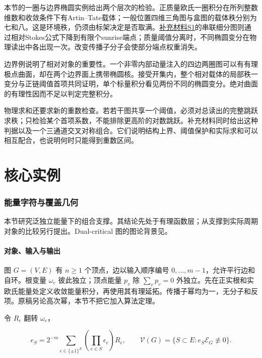 \documentclass[11pt,a4paper,oneside]{ctexart}
\theoremstyle{cnplain}
\theoremstyle{definition}
\theoremstyle{remark}
\numberwithin{equation}{section}
\newcommand{\otherref}[2]{\href{#1.pdf}{#2}}
\begin{document}
本节的一圈与边界椭圆实例给出两个层次的检验。正质量欧氏一圈积分在所列整数维数和收敛条件下有Artin--Tate载体；一般位置四维三角图与盒图的载体秩分别为七和八。这是环境秩，仍须由标架决定是否取满。\otherref{feynman_periods_supplement}{补充材料S1}的串联细分图则通过相对Stokes公式下降到有限个sunrise端点；质量阈值分离时，不同椭圆变分在物理读出中各出现一次。改变传播子分子会使部分端点权重消失。

边界例说明了相对对象的重要性。一个非零内部动量注入的四边两圈图可以有有理极点曲面，却在两个边界面上携带椭圆核。接受开集内，整个相对载体的局部秩一变分与正链阈值首项共同证明，单个标量积分看见两份不同的椭圆变分。绝对曲面的有理性因而不足以判定完整积分。

物理求和还要求新的重数检查。若若干图共享一个阈值，必须对总读出的完整跳跃求秩；只检验某个首项系数，不能排除更高阶的对数跳跃。补充材料同时给出这种判据以及一个三通道交叉对称组合。它们说明结构上界、阈值保护和实际求和可以相互配合，也说明何时只能得到重数区间。

\part{核心实例}

\section{能量字符与覆盖几何}\label{ch:graph}

\begingroup

本节研究泛独立能量下的组合支撑。其结论先处于有理函数层；从支撑到实际周期对象的比较另行提出。Dual-critical 图的图论背景见\cite{dualcritical}。

\subsection{对象、输入与输出}\label{sec:graph:1}

图 \(G=(V,E)\) 有 \(n\geq1\) 个顶点，边以输入顺序编号 \(0,\ldots,m-1\)，允许平行边和自环。根变量 \(\omega_e\) 彼此独立；顶点能量 \(p_v\) 除 \(\sum_vp_v=0\) 外独立。先在正实根和实欧氏能量处定义收敛能量积分，再使用其有理延拓。传播子幂均为一，无分子和反项。原稿另论高次幂，本节不把它加入算法定理。

令 \(R_e\) 翻转 \(\omega_e\)，

\begin{equation}
e_S=2^{-m}\sum_{\epsilon\in\{\pm1\}^{E}}
       \left(\prod_{e\in S}\epsilon_e\right)R_\epsilon,\qquad
 \mathcal V(G)=\{S\subset E:e_S\mathscr E_G\not\equiv0\}.
\end{equation}
\end{document}
